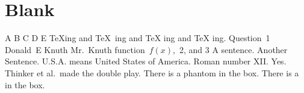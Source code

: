 \documentclass{article}
\begin{document}
    \section{Blank}
        A B  C   D    E\newline
        \TeX ing and \TeX\ ing and \TeX{} ing and {\TeX} ing. \newline
        Question~1\newline          %
        Donald~E Knuth\newline      %
        Mr.~Knuth\newline           %
        function~$f(x)$,~2, and 3\newline         %
        A sentence. Another Sentence. \newline              %
        U.S.A. means United States of America. \newline     %
        Roman number XII\@. Yes. \newline                   %
        Thinker et al.\ made the double play.               %
        There is a phantom in the box. 
        There is a \phantom{phantom} in the box. 
\end{document}
